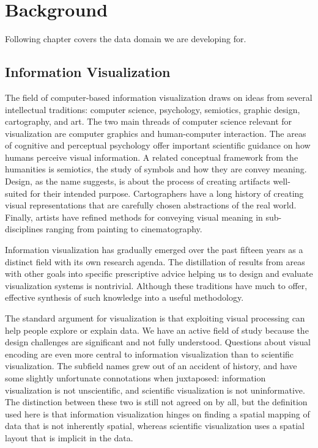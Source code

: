 \newpage
\section{Background}

Following chapter covers the data domain we are developing for.

\label{sec:background}


\subsection{Information Visualization}
\label{sec:infovis}

The field of computer-based information visualization draws on ideas from several intellectual traditions: computer science, psychology, semiotics, graphic design, cartography, and art.
The two main threads of computer science relevant for visualization are computer graphics and human-computer interaction.
The areas of cognitive and perceptual psychology offer important scientific guidance on how humans perceive visual information.
A related conceptual framework from the humanities is semiotics, the study of symbols and how they are convey meaning.
Design, as the name suggests, is about the process of creating artifacts well- suited for their intended purpose.
Cartographers have a long history of creating visual representations that are carefully chosen abstractions of the real world.
Finally, artists have refined methods for conveying visual meaning in sub-disciplines ranging from painting to cinematography.

Information visualization has gradually emerged over the past fifteen years as a distinct field with its own research agenda.
The distillation of results from areas with other goals into specific prescriptive advice helping us to design and evaluate visualization systems is nontrivial.
Although these traditions have much to offer, effective synthesis of such knowledge into a useful methodology.

The standard argument for visualization is that exploiting visual processing can help people explore or explain data. We have an active field of study because the design challenges are significant and not fully understood. Questions about visual encoding are even more central to information visualization than to scientific visualization.
The subfield names grew out of an accident of history, and have some slightly unfortunate connotations when juxtaposed:
information visualization is not unscientific, and scientific visualization is not uninformative.
The distinction between these two is still not agreed on by all, but the definition used here is that information visualization hinges on finding a spatial mapping of data that is not inherently spatial,
whereas scientific visualization uses a spatial layout that is implicit in the data.

